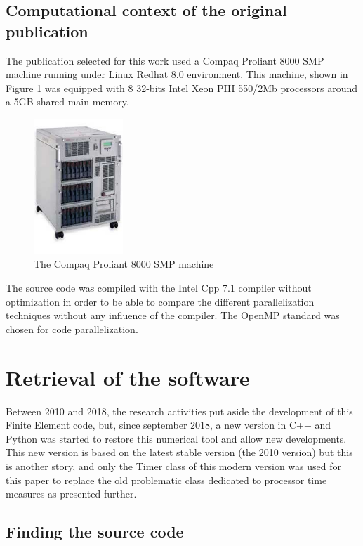 \subsection{Computational context of the original publication}
The publication selected for this work \cite{Pantale:2005} used a Compaq Proliant 8000 SMP machine running under Linux Redhat 8.0 environment. This machine, shown in Figure \ref{proliant} was equipped with 8 32-bits Intel Xeon PIII 550/2Mb processors around a 5GB shared main memory. 
\begin{figure}[h] 
  \centering
  \includegraphics[width=0.3\textwidth]{./8000_photo.jpg}
  \caption{The Compaq Proliant 8000 SMP machine}
  \label{proliant}
\end{figure}
The source code was compiled with the Intel Cpp 7.1 compiler without optimization in order to be able to compare the different parallelization techniques without any influence of the compiler. The OpenMP standard was chosen for code parallelization.

\section{Retrieval of the software}

Between 2010 and 2018, the research activities put aside the development of this Finite Element code, but, since september 2018, a new version in C++ and Python was started to restore this numerical tool and allow new developments. This new version is based on the latest stable version (the 2010 version) but this is another story, and only the Timer class of this modern version was used for this paper to replace the old problematic class dedicated to processor time measures as presented further.

\subsection{Finding the source code}

